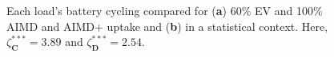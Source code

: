 \begin{figure}[!h]\centering
 \hspace{5mm}
 \caption{Each load's battery cycling compared for (\textbf{a}) 60\% EV and 100\% AIMD and AIMD+ uptake  and (\textbf{b}) in a statistical context. Here, $\zeta_\textbf{C}^{***}=3.89$ and $\zeta_\textbf{D}^{***}=2.54$.}
 \label{ch1:fig:battery-cycling}
\end{figure}